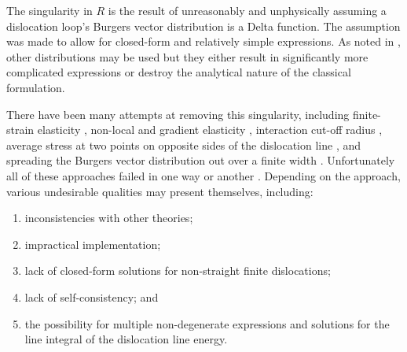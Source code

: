 The singularity in $ R $ is the result of unreasonably and unphysically assuming a dislocation loop's Burgers vector distribution is a Delta function. The assumption was made to allow for closed-form and relatively simple expressions. As noted in \cite{bv_dist}, other distributions may be used but they either result in significantly more complicated expressions or destroy the analytical nature of the classical formulation.

There have been many attempts at removing this singularity, including finite-strain elasticity \cite{non_sing3}, non-local and gradient elasticity \cite{non_sing1, non_sing2}, interaction cut-off radius \cite{pk_force}, average stress at two points on opposite sides of the dislocation line \cite{non_sing4, non_sing5}, and spreading the Burgers vector distribution out over a finite width \cite{bv_dist, non_sing6, non_sing7}. Unfortunately all of these approaches failed in one way or another \cite{a_non-singular_continuum_theory_of_dislocations}. Depending on the approach, various undesirable qualities may present themselves, including:
\begin{enumerate}
  \item inconsistencies with other theories;
  \item impractical implementation;
  \item lack of closed-form solutions for non-straight finite dislocations;
  \item lack of self-consistency; and
  \item the possibility for multiple non-degenerate expressions and solutions for the line integral of the dislocation line energy.
\end{enumerate}

